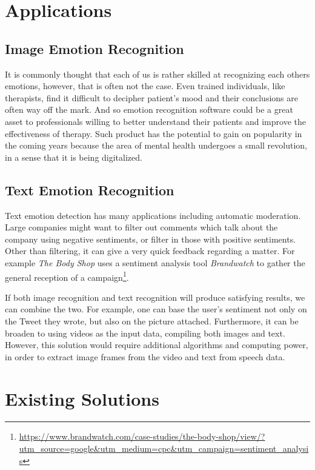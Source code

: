 \documentclass{ledger}
\begin{document}
\section{Applications}

\subsection{Image Emotion Recognition}
It is commonly thought that each of us is rather skilled at recognizing each others emotions, however, that is often not the case. Even trained individuals, like therapists, find it difficult to decipher patient's mood and their conclusions are often way off the mark. And so emotion recognition software could be a great asset to professionals willing to better understand their patients and improve the effectiveness of therapy. Such product has the potential to gain on popularity in the coming years because the area of mental health undergoes a small revolution, in a sense that it is being digitalized.

\subsection{Text Emotion Recognition}

Text emotion detection has many applications including automatic moderation. Large companies might want to filter out comments which talk about the company using negative sentiments, or filter in those with positive sentiments. Other than filtering, it can give a very quick feedback regarding a matter. For example \textit{The Body Shop} uses a sentiment analysis tool \textit{Brandwatch} to gather the general reception of a campaign\footnote{\url{https://www.brandwatch.com/case-studies/the-body-shop/view/?utm_source=google&utm_medium=cpc&utm_campaign=sentiment_analysis}}.

\hfill

If both image recognition and text recognition will produce satisfying results, we can combine the two. For example, one can base the user's sentiment not only on the Tweet they wrote, but also on the picture attached. Furthermore, it can be broaden to using videos as the input data, compiling both images and text. However, this solution would require additional algorithms and computing power, in order to extract image frames from the video and text from speech data.

\section{Existing Solutions}
\end{document}
